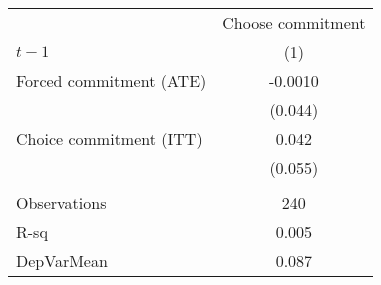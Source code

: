 \begin{tabular}{lc}
\toprule
      & Choose commitment \\
\cmidrule{2-2}$t-1$ & (1) \\
\midrule
\midrule
Forced commitment (ATE) & -0.0010 \\
      & (0.044) \\
Choice commitment (ITT) & 0.042 \\
      & (0.055) \\
      &  \\
\midrule
Observations & 240 \\
R-sq  & 0.005 \\
DepVarMean & 0.087 \\
\bottomrule
\bottomrule
\end{tabular}%
